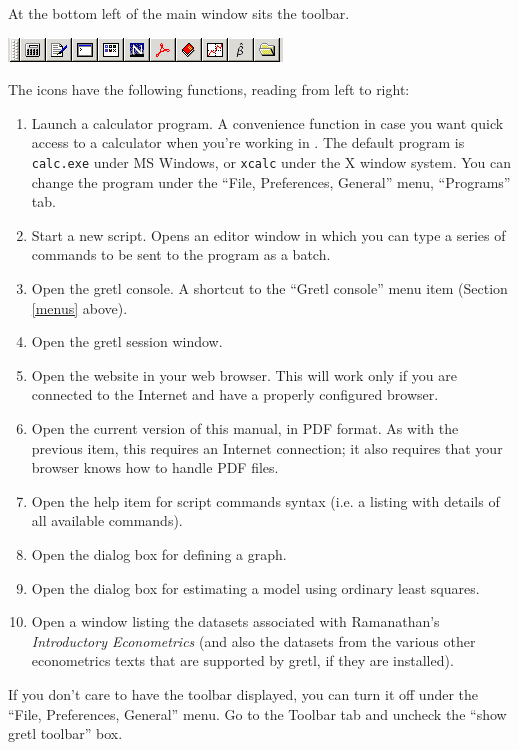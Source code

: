 At the bottom left of the main window sits the
      toolbar.\begin{center}
        \includegraphics[scale=0.5]{figures/toolbar}
      \end{center}
The icons have the following functions, reading from left to
      right:
\begin{enumerate}
\item Launch a calculator program.  A convenience function in case you
  want quick access to a calculator when you're working in
  .  The default program is \verb+calc.exe+ under MS
  Windows, or \verb+xcalc+ under the X window system.  You can change
  the program under the ``File, Preferences, General'' menu,
  ``Programs'' tab.
\item Start a new script.  Opens an editor window in which you can
  type a series of commands to be sent to the program as a batch.
\item Open the gretl console.  A shortcut to the ``Gretl console''
  menu item (Section \ref{menus} above).
\item Open the gretl session window.
\item Open the  website in your web browser.  This will
  work only if you are connected to the Internet and have a properly
  configured browser.
\item Open the current version of this manual, in PDF format.  As with
  the previous item, this requires an Internet connection; it also
  requires that your browser knows how to handle PDF files.
\item Open the help item for script commands syntax (i.e. a listing
  with details of all available commands).
\item Open the dialog box for defining a graph.
\item Open the dialog box for estimating a model using ordinary least
  squares.
\item Open a window listing the datasets associated with Ramanathan's
  \emph{Introductory Econometrics} (and also the datasets from the
  various other econometrics texts that are supported by gretl, if
  they are installed).
\end{enumerate}


If you don't care to have the toolbar displayed, you can turn it
off under the ``File, Preferences, General'' menu. Go
      to the Toolbar tab and uncheck the ``show gretl
	toolbar'' box.


